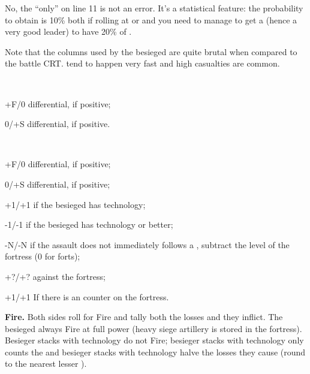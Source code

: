 \begin{designnote}
  No, the ``only'' \textetoile\textetoile on line 11 is not an error. It's a
  statistical feature: the probability to obtain
  \textetoile\textetoile\textetoile is 10\% both if rolling at  or
   and you need to manage to get a  (hence a very good
  leader) to have 20\% of \textetoile\textetoile\textetoile.
\end{designnote}

Note that the columns used by the besieged are quite brutal when compared to
the battle CRT. \textetoile tend to happen very fast and high casualties are
common.

~\\
\begin{modlist}
\item[+F/0] \Fire differential, if positive;
\item[0/+S] \Shock differential, if positive.
\end{modlist}

~\\
\begin{modlist}
\item[+F/0] \Fire differential, if positive;
\item[0/+S] \Shock differential, if positive;
\item[+1/+1] if the besieged has \TMED technology;
\item[-1/-1] if the besieged has \TARQ technology or better;
\item[-N/-N] if the assault does not immediately follows a ,
  subtract the level of the fortress (0 for forts);
\item[+?/+?]  against the fortress;
\item[+1/+1] If there is an \ASSAULT counter on the fortress.
\end{modlist}

\textbf{Fire.} Both sides roll for Fire and tally both the losses and
\textetoile they inflict. The besieged always Fire at full power (heavy siege
artillery is stored in the fortress). Besieger stacks with \TMED technology do
not Fire; besieger stacks with \TREN technology only counts the \textetoile
and besieger stacks with \TARQ technology halve the losses they cause (round
to the nearest lesser \texttu).

